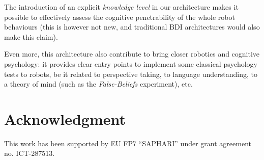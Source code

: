 \documentclass[letterpaper, 10 pt, conference]{ieeeconf}  %
\begin{document}
The introduction of an explicit \emph{knowledge level} in our architecture
makes it possible to effectively assess the cognitive penetrability of the
whole robot behaviours (this is however not new, and traditional BDI
architectures would also make this claim).

Even more, this architecture also contribute to bring closer robotics and
cognitive psychology: it provides clear entry points to implement some
classical psychology tests to robots, be it related to perspective taking, to
language understanding, to a theory of mind (such as the \emph{False-Beliefs}
experiment), etc.

\section*{Acknowledgment}

This work has been supported by EU FP7 ``SAPHARI'' under grant agreement no. ICT-287513.



\end{document}
